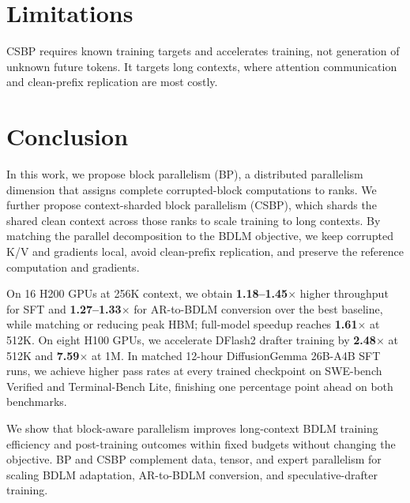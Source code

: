 \section{Limitations}
\label{sec:limitations}
CSBP requires known training targets and accelerates training, not generation
of unknown future tokens. It targets long contexts, where attention
communication and clean-prefix replication are most costly.

\section{Conclusion}
\label{sec:conclusion}
In this work, we propose block parallelism (BP), a distributed parallelism
dimension that assigns complete corrupted-block computations to ranks.
We further propose context-sharded block parallelism (CSBP), which shards
the shared clean context across those ranks to scale training to long
contexts. By matching the parallel decomposition to the BDLM objective,
we keep corrupted K/V and gradients local, avoid clean-prefix replication,
and preserve the reference computation and gradients.

On 16 H200 GPUs at 256K context, we obtain \textbf{1.18--1.45$\boldsymbol{\times}$} higher
throughput for SFT and \textbf{1.27--1.33$\boldsymbol{\times}$} for AR-to-BDLM conversion over
the best baseline, while matching or reducing peak HBM; full-model speedup
reaches \textbf{1.61$\boldsymbol{\times}$} at 512K. On eight H100 GPUs, we accelerate DFlash2
drafter training by \textbf{2.48$\boldsymbol{\times}$} at 512K and \textbf{7.59$\boldsymbol{\times}$} at 1M.
In matched 12-hour DiffusionGemma 26B-A4B SFT runs, we achieve higher pass
rates at every trained checkpoint on SWE-bench Verified and Terminal-Bench
Lite, finishing one percentage point ahead on both benchmarks.

We show that block-aware parallelism improves long-context BDLM training
efficiency and post-training outcomes within fixed budgets without changing
the objective. BP and CSBP complement data, tensor, and expert parallelism
for scaling BDLM adaptation, AR-to-BDLM conversion, and speculative-drafter
training.
